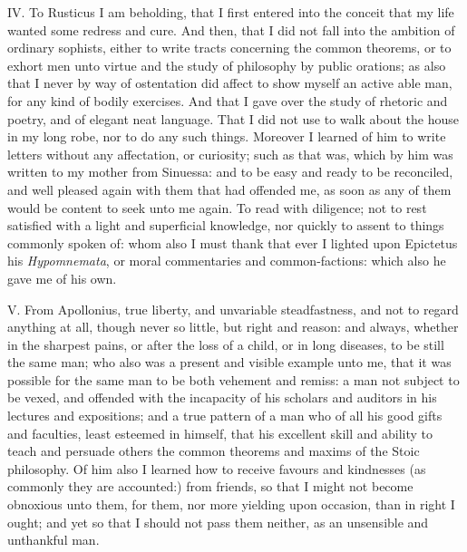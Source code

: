 IV. To Rusticus I am beholding, that I first entered into the conceit
that my life wanted some redress and cure. And then, that I did not fall
into the ambition of ordinary sophists, either to write tracts concerning
the common theorems, or to exhort men unto virtue and the study of
philosophy by public orations; as also that I never by way of ostentation
did affect to show myself an active able man, for any kind of bodily
exercises. And that I gave over the study of rhetoric and poetry, and of
elegant neat language. That I did not use to walk about the house in my
long robe, nor to do any such things. Moreover I learned of him to write
letters without any affectation, or curiosity; such as that was, which by
him was written to my mother from Sinuessa: and to be easy and ready to be
reconciled, and well pleased again with them that had offended me, as soon
as any of them would be content to seek unto me again. To read with
diligence; not to rest satisfied with a light and superficial knowledge,
nor quickly to assent to things commonly spoken of: whom also I must thank
that ever I lighted upon Epictetus his \emph{Hypomnemata}, or moral commentaries
and common-factions: which also he gave me of his own.

V. From Apollonius, true liberty, and unvariable steadfastness, and not
to regard anything at all, though never so little, but right and reason:
and always, whether in the sharpest pains, or after the loss of a child,
or in long diseases, to be still the same man; who also was a present and
visible example unto me, that it was possible for the same man to be both
vehement and remiss: a man not subject to be vexed, and offended with the
incapacity of his scholars and auditors in his lectures and expositions;
and a true pattern of a man who of all his good gifts and faculties, least
esteemed in himself, that his excellent skill and ability to teach and
persuade others the common theorems and maxims of the Stoic philosophy. Of
him also I learned how to receive favours and kindnesses (as commonly they
are accounted:) from friends, so that I might not become obnoxious unto
them, for them, nor more yielding upon occasion, than in right I ought;
and yet so that I should not pass them neither, as an unsensible and
unthankful man.

